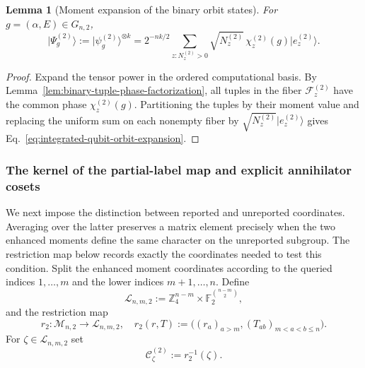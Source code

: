 \documentclass[11pt]{article}
\newcommand{\F}{\mathbb F}
\newcommand{\1}{\mathbf 1}
\newcommand{\ket}[1]{\lvert #1\rangle}
\theoremstyle{plain}
\newtheorem{lemma}[theorem]{Lemma}
\theoremstyle{definition}
\theoremstyle{remark}
\begin{document}
\begin{lemma}[Moment expansion of the binary orbit states]
\label{lem:binary-orbit-moment-expansion}
For $g=(\alpha,E)\in G_{n,2}$,
\begin{equation}
 \ket{\Psi_g^{(2)}}
 :=\ket{\psi_g^{(2)}}^{\otimes k}
 =2^{-nk/2}\sum_{z:N_z^{(2)}>0}
   \sqrt{N_z^{(2)}}\,\chi_z^{(2)}(g)\ket{e_z^{(2)}}.
 \label{eq:integrated-qubit-orbit-expansion}
\end{equation}
\end{lemma}
\begin{proof}
Expand the tensor power in the ordered computational basis.  By
Lemma~\ref{lem:binary-tuple-phase-factorization}, all tuples in the fiber
$\mathcal F_z^{(2)}$ have the common phase $\chi_z^{(2)}(g)$.
Partitioning the tuples by their moment value and replacing the uniform sum
on each nonempty fiber by
$\sqrt{N_z^{(2)}}\ket{e_z^{(2)}}$ gives
Eq.~\eqref{eq:integrated-qubit-orbit-expansion}.
\end{proof}

\subsubsection{The kernel of the partial-label map and explicit annihilator cosets}
We next impose the distinction between reported and unreported coordinates.  Averaging over the latter preserves a matrix element precisely when the two enhanced moments define the same character on the unreported subgroup.  The restriction map below records exactly the coordinates needed to test this condition.  Split the enhanced moment coordinates according to the queried indices
$1,\ldots,m$ and the lower indices $m+1,\ldots,n$.  Define
\begin{equation}
 \mathcal L_{n,m,2}
 :=\mathbb Z_4^{n-m}\times
   \F_2^{\binom{n-m}{2}},
 \label{eq:binary-lower-moment-space}
\end{equation}
and the restriction map
\begin{equation}
 r_2:\mathcal M_{n,2}\longrightarrow\mathcal L_{n,m,2},
 \quad
 r_2(r,T)
 :=\bigl((r_a)_{a>m},(T_{ab})_{m<a<b\le n}\bigr).
 \label{eq:binary-lower-moment-restriction}
\end{equation}
For $\zeta\in\mathcal L_{n,m,2}$ set
\begin{equation}
 \mathcal C_\zeta^{(2)}:=r_2^{-1}(\zeta).
 \label{eq:binary-annihilator-coset-fiber}
\end{equation}
\end{document}
